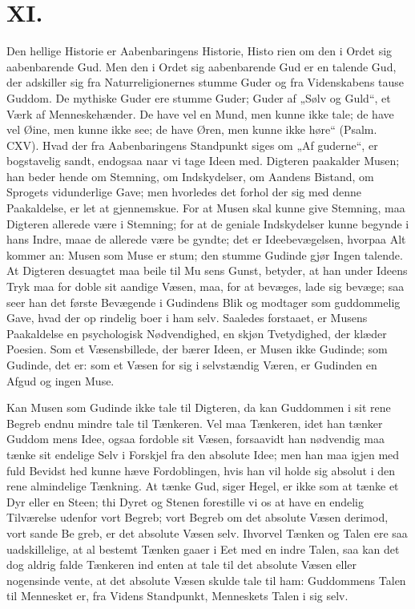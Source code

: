 \documentclass[12pt]{book}
\newcommand{\opage}[1]{\marginnote{\footnotesize\textit{[#1]}}}
\begin{document}
\chapter*{XI.}
\label{ch:xi}
\opage{176}\setcounter{footnote}{0}%
Den hellige Historie er Aabenbaringens Historie, Histo\-%
rien om den i Ordet sig aabenbarende Gud. Men den
i Ordet sig aabenbarende Gud er en talende Gud, der
adskiller sig fra Naturreligionernes stumme Guder og fra
Videnskabens tause Guddom. De mythiske Guder ere
stumme Guder; Guder af „Sølv og Guld“, et Værk af
Menneskehænder. De have vel en Mund, men kunne
ikke tale; de have vel Øine, men kunne ikke see; de
have Øren, men kunne ikke høre“ (Psalm. CXV).
Hvad der fra Aabenbaringens Standpunkt siges om „Af\-%
guderne“, er bogstavelig sandt, endogsaa naar vi tage
Ideen med. Digteren paakalder Musen; han beder hende
om Stemning, om Indskydelser, om Aandens Bistand, om
Sprogets vidunderlige Gave; men hvorledes det forhol\-%
der sig med denne Paakaldelse, er let at gjennemskue.
For at Musen skal kunne give Stemning, maa Digteren
allerede være i Stemning; for at de geniale Indskydelser
kunne begynde i hans Indre, maae de allerede være be\-%
gyndte; det er Ideebevægelsen, hvorpaa Alt kommer an:
Musen som Muse er stum; den stumme Gudinde gjør
Ingen talende. At Digteren desuagtet maa beile til Mu\-%
sens Gunst, betyder, at han under Ideens Tryk maa for\-%
doble sit aandige Væsen, maa, for at bevæges, lade sig
\opage{177}\setcounter{footnote}{0}%
bevæge; saa seer han det første Bevægende i Gudindens
Blik og modtager som guddommelig Gave, hvad der op\-%
rindelig boer i ham selv. Saaledes forstaaet, er Musens
Paakaldelse en psychologisk Nødvendighed, en skjøn
Tvetydighed, der klæder Poesien. Som et Væsensbillede,
der bærer Ideen, er Musen ikke Gudinde; som Gudinde,
det er: som et Væsen for sig i selvstændig Væren, er
Gudinden en Afgud og ingen Muse.

Kan Musen som Gudinde ikke tale til Digteren, da
kan Guddommen i sit rene Begreb endnu mindre tale til
Tænkeren. Vel maa Tænkeren, idet han tænker Guddom\-%
mens Idee, ogsaa fordoble sit Væsen, forsaavidt han
nødvendig maa tænke sit endelige Selv i Forskjel fra
den absolute Idee; men han maa igjen med fuld Bevidst\-%
hed kunne hæve Fordoblingen, hvis han vil holde sig
absolut i den rene almindelige Tænkning. At tænke
Gud, siger Hegel, er ikke som at tænke et Dyr
eller en Steen; thi Dyret og Stenen forestille vi os at
have en endelig Tilværelse udenfor vort Begreb; vort
Begreb om det absolute Væsen derimod, vort sande Be\-%
greb, er det absolute Væsen selv. Ihvorvel Tænken og
Talen ere saa uadskillelige, at al bestemt Tænken gaaer
i Eet med en indre Talen, saa kan det dog aldrig falde
Tænkeren ind enten at tale til det absolute Væsen eller
nogensinde vente, at det absolute Væsen skulde tale til
ham: Guddommens Talen til Mennesket er, fra Videns
Standpunkt, Menneskets Talen i sig selv.
\end{document}
